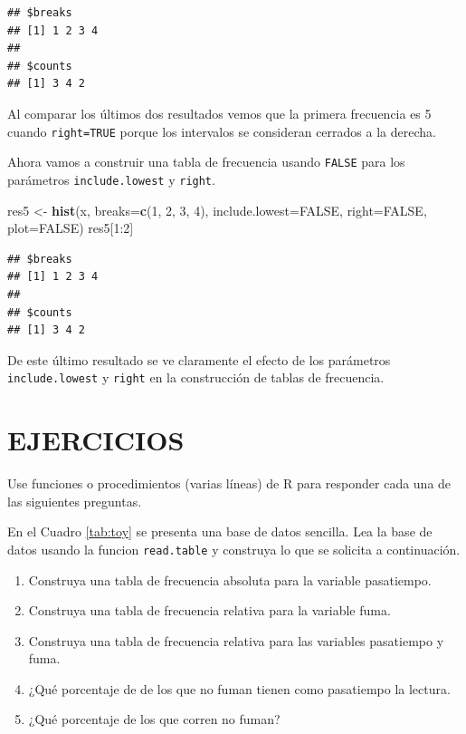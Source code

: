 \documentclass[10pt,]{krantz}
\makeatletter
\newenvironment{Shaded}{\begin{snugshade}}{\end{snugshade}}
\newcommand{\KeywordTok}[1]{\textcolor[rgb]{0.13,0.29,0.53}{\textbf{{#1}}}}
\newcommand{\DataTypeTok}[1]{\textcolor[rgb]{0.13,0.29,0.53}{{#1}}}
\newcommand{\DecValTok}[1]{\textcolor[rgb]{0.00,0.00,0.81}{{#1}}}
\newcommand{\StringTok}[1]{\textcolor[rgb]{0.31,0.60,0.02}{{#1}}}
\newcommand{\OtherTok}[1]{\textcolor[rgb]{0.56,0.35,0.01}{{#1}}}
\newcommand{\NormalTok}[1]{{#1}}
\providecommand{\tightlist}{%
  \setlength{\itemsep}{0pt}\setlength{\parskip}{0pt}}
\let\proglang=\textsf
\newenvironment{kframe}{%
\medskip{}
\setlength{\fboxsep}{.8em}
 \def\at@end@of@kframe{}%
 \ifinner\ifhmode%
  \def\at@end@of@kframe{\end{minipage}}%
  \begin{minipage}{\columnwidth}%
 \fi\fi%
 \def\FrameCommand##1{\hskip\@totalleftmargin \hskip-\fboxsep
 \colorbox{shadecolor}{##1}\hskip-\fboxsep
     \hskip-\linewidth \hskip-\@totalleftmargin \hskip\columnwidth}%
 \MakeFramed {\advance\hsize-\width
   \@totalleftmargin\z@ \linewidth\hsize
   \@setminipage}}%
 {\par\unskip\endMakeFramed%
 \at@end@of@kframe}
\renewenvironment{Shaded}{\begin{kframe}}{\end{kframe}}
\makeatother
\begin{document}
\begin{verbatim}
## $breaks
## [1] 1 2 3 4
## 
## $counts
## [1] 3 4 2
\end{verbatim}

Al comparar los últimos dos resultados vemos que la primera frecuencia
es 5 cuando \texttt{right=TRUE} porque los intervalos se consideran
cerrados a la derecha.

Ahora vamos a construir una tabla de frecuencia usando \texttt{FALSE}
para los parámetros \texttt{include.lowest} y \texttt{right}.

\begin{Shaded}
\begin{Highlighting}[]
\NormalTok{res5 <-}\StringTok{ }\KeywordTok{hist}\NormalTok{(x, }\DataTypeTok{breaks=}\KeywordTok{c}\NormalTok{(}\DecValTok{1}\NormalTok{, }\DecValTok{2}\NormalTok{, }\DecValTok{3}\NormalTok{, }\DecValTok{4}\NormalTok{),}
             \DataTypeTok{include.lowest=}\OtherTok{FALSE}\NormalTok{, }\DataTypeTok{right=}\OtherTok{FALSE}\NormalTok{,}
             \DataTypeTok{plot=}\OtherTok{FALSE}\NormalTok{)}
\NormalTok{res5[}\DecValTok{1}\NormalTok{:}\DecValTok{2}\NormalTok{]}
\end{Highlighting}
\end{Shaded}

\begin{verbatim}
## $breaks
## [1] 1 2 3 4
## 
## $counts
## [1] 3 4 2
\end{verbatim}

De este último resultado se ve claramente el efecto de los parámetros
\texttt{include.lowest} y \texttt{right} en la construcción de tablas de
frecuencia.

\section*{EJERCICIOS}\label{ejercicios-4}


Use funciones o procedimientos (varias líneas) de \proglang{R} para
responder cada una de las siguientes preguntas.

En el Cuadro \ref{tab:toy} se presenta una base de datos sencilla. Lea
la base de datos usando la funcion \texttt{read.table} y construya lo
que se solicita a continuación.

\begin{enumerate}
\def\labelenumi{\arabic{enumi}.}
\tightlist
\item
  Construya una tabla de frecuencia absoluta para la variable
  pasatiempo.
\item
  Construya una tabla de frecuencia relativa para la variable fuma.
\item
  Construya una tabla de frecuencia relativa para las variables
  pasatiempo y fuma.
\item
  ¿Qué porcentaje de de los que no fuman tienen como pasatiempo la
  lectura.
\item
  ¿Qué porcentaje de los que corren no fuman?
\end{enumerate}
\end{document}
